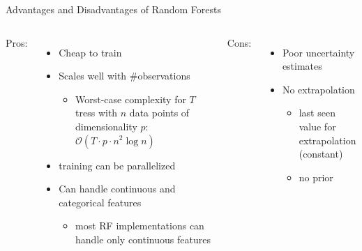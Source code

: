 \begin{frame}[c,fragile]{Advantages and Disadvantages of Random Forests}


\begin{columns}
Pros:
\begin{itemize}
\item Cheap to train
\item Scales well with \#observations
\begin{itemize}
	\item Worst-case complexity for $T$ tress with $n$ data points of dimensionality $p$: $\mathcal O(T\cdot p \cdot n^2 \log{n})$
\end{itemize}
\item training can be parallelized
\item Can handle continuous and categorical features
\begin{itemize}
	\item most RF implementations can handle only continuous features
\end{itemize}
\end{itemize}

Cons:
\begin{itemize}
\item Poor uncertainty estimates
\item No extrapolation
\begin{itemize}
	\item last seen value for extrapolation (constant)
	\item no prior
\end{itemize}
\end{itemize}

\end{columns}

\end{frame}
